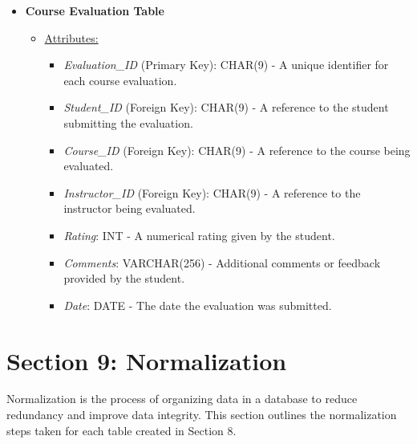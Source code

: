 \documentclass[12pt]{article}
\begin{document}
\begin{itemize}
    \item \textbf{Course Evaluation Table}
    \begin{itemize}
        \item \underline{Attributes:}
        \begin{itemize}
            \item \textit{Evaluation\_ID} (Primary Key): CHAR(9) - A unique identifier for each course evaluation.
            \item \textit{Student\_ID} (Foreign Key): CHAR(9) - A reference to the student submitting the evaluation.
            \item \textit{Course\_ID} (Foreign Key): CHAR(9) - A reference to the course being evaluated.
            \item \textit{Instructor\_ID} (Foreign Key): CHAR(9) - A reference to the instructor being evaluated.
            \item \textit{Rating}: INT - A numerical rating given by the student.
            \item \textit{Comments}: VARCHAR(256) - Additional comments or feedback provided by the student.
            \item \textit{Date}: DATE - The date the evaluation was submitted.
        \end{itemize}
    \end{itemize}
    
\end{itemize}


\pagebreak

\section*{Section 9: Normalization}

Normalization is the process of organizing data in a database to reduce redundancy and improve data integrity. This section outlines the normalization steps taken for each table created in Section 8.
\end{document}
